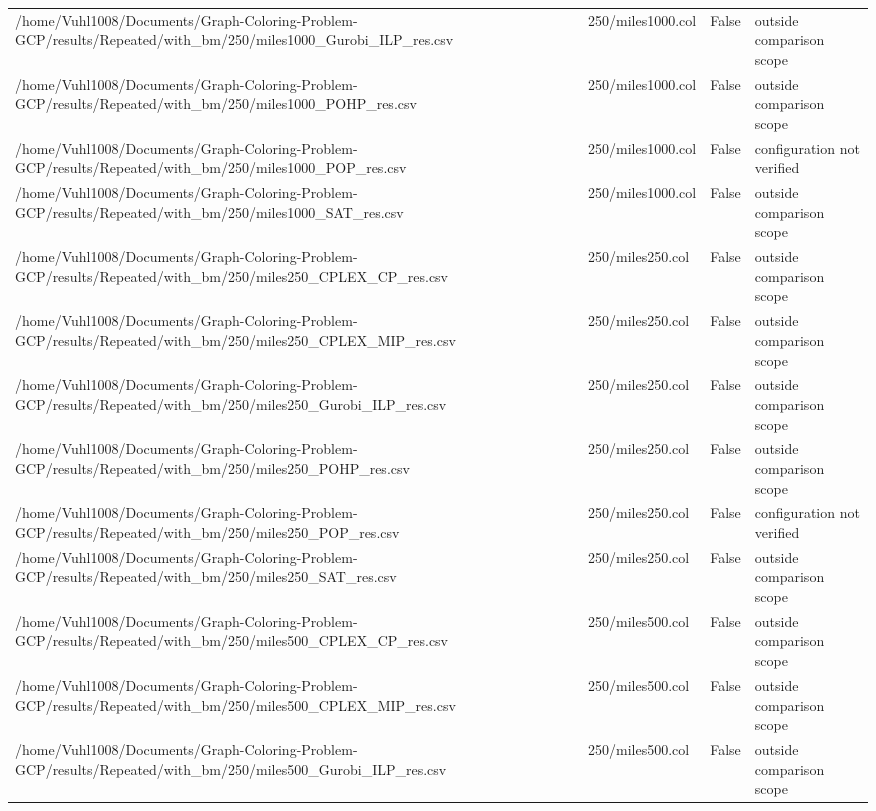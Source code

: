 \begin{table}[htbp]
\begin{tabular}{llll}
/home/Vuhl1008/Documents/Graph-Coloring-Problem-GCP/results/Repeated/with\_bm/250/miles1000\_Gurobi\_ILP\_res.csv & 250/miles1000.col & False & outside comparison scope \\
/home/Vuhl1008/Documents/Graph-Coloring-Problem-GCP/results/Repeated/with\_bm/250/miles1000\_POHP\_res.csv & 250/miles1000.col & False & outside comparison scope \\
/home/Vuhl1008/Documents/Graph-Coloring-Problem-GCP/results/Repeated/with\_bm/250/miles1000\_POP\_res.csv & 250/miles1000.col & False & configuration not verified \\
/home/Vuhl1008/Documents/Graph-Coloring-Problem-GCP/results/Repeated/with\_bm/250/miles1000\_SAT\_res.csv & 250/miles1000.col & False & outside comparison scope \\
/home/Vuhl1008/Documents/Graph-Coloring-Problem-GCP/results/Repeated/with\_bm/250/miles250\_CPLEX\_CP\_res.csv & 250/miles250.col & False & outside comparison scope \\
/home/Vuhl1008/Documents/Graph-Coloring-Problem-GCP/results/Repeated/with\_bm/250/miles250\_CPLEX\_MIP\_res.csv & 250/miles250.col & False & outside comparison scope \\
/home/Vuhl1008/Documents/Graph-Coloring-Problem-GCP/results/Repeated/with\_bm/250/miles250\_Gurobi\_ILP\_res.csv & 250/miles250.col & False & outside comparison scope \\
/home/Vuhl1008/Documents/Graph-Coloring-Problem-GCP/results/Repeated/with\_bm/250/miles250\_POHP\_res.csv & 250/miles250.col & False & outside comparison scope \\
/home/Vuhl1008/Documents/Graph-Coloring-Problem-GCP/results/Repeated/with\_bm/250/miles250\_POP\_res.csv & 250/miles250.col & False & configuration not verified \\
/home/Vuhl1008/Documents/Graph-Coloring-Problem-GCP/results/Repeated/with\_bm/250/miles250\_SAT\_res.csv & 250/miles250.col & False & outside comparison scope \\
/home/Vuhl1008/Documents/Graph-Coloring-Problem-GCP/results/Repeated/with\_bm/250/miles500\_CPLEX\_CP\_res.csv & 250/miles500.col & False & outside comparison scope \\
/home/Vuhl1008/Documents/Graph-Coloring-Problem-GCP/results/Repeated/with\_bm/250/miles500\_CPLEX\_MIP\_res.csv & 250/miles500.col & False & outside comparison scope \\
/home/Vuhl1008/Documents/Graph-Coloring-Problem-GCP/results/Repeated/with\_bm/250/miles500\_Gurobi\_ILP\_res.csv & 250/miles500.col & False & outside comparison scope \\

\end{tabular}
\end{table}
